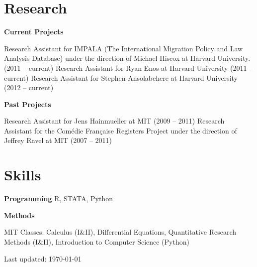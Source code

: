 \documentclass[letterpaper]{article}
\renewenvironment{itemize}{
  \begin{list}{}{
    \setlength{\leftmargin}{1.5em}
  }
}{
  \end{list}
}
\begin{document}
\section*{Research}
\begin{itemize}
\item {\bf Current Projects}

\leftskip 0.5in
\parindent -0.5in
\subitem Research Assistant for IMPALA (The International Migration Policy and Law Analysis Database) under the direction of Michael Hiscox at Harvard University. (2011 -- current)
\subitem Research Assistant for Ryan Enos at Harvard University (2011 -- current)
\subitem Research Assistant for Stephen Ansolabehere at Harvard University (2012 -- current)\\


\leftskip 0in
\item {\bf Past Projects}

\leftskip 0.5in
\parindent -0.5in
\subitem Research Assistant for Jens Hainmueller at MIT (2009 -- 2011)
\subitem Research Assistant for the Com\'edie Fran\c caise Registers Project under the direction of Jeffrey Ravel at MIT (2007 -- 2011)
\end{itemize}




\section*{Skills}
\begin{itemize}
\item {\bf Programming}
\subitem R, STATA, Python
\item {\bf Methods}

\leftskip 0.5in
\parindent -0.5in

\subitem MIT Classes: Calculus (I\&II), Differential Equations, Quantitative Research Methods (I\&II), Introduction to Computer Science (Python) 

\end{itemize}

\bigskip

\begin{center}
  \begin{footnotesize}
    Last updated: \today \\
  \end{footnotesize}
\end{center}
\end{document}
